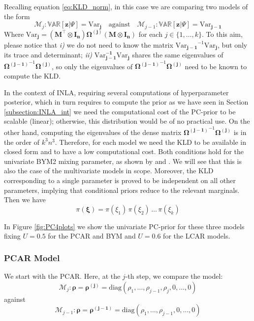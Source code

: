 \documentclass[openany, 11pt, oneside]{book}
\begin{document}
Recalling equation \ref{eq:KLD_norm}, in this case we are comparing two models of the form
$$
\mathcal{M}_j:\mathbb{VAR}\left[ \boldsymbol{z} \vert \Psi\right]=\boldsymbol{\mathrm{Var}_j}
\quad \text{against} \quad
\mathcal{M}_{j-1}:\mathbb{VAR}\left[ \boldsymbol{z} \vert \Psi\right]=\boldsymbol{\mathrm{Var}_{j-1}}
$$
Where $\boldsymbol{\mathrm{Var}_j} = \left( \boldsymbol{M^\top} \otimes \boldsymbol{I_n} \right) \boldsymbol{\Omega^{(j)}} \left( \boldsymbol{M} \otimes \boldsymbol{I_n} \right) $ for each $j \in \lbrace 1, \dots, k\rbrace$. To this aim, please notice that \textit{i)} we do not need to know the matrix $\boldsymbol{\mathrm{Var}_{j-1}}^{-1} \boldsymbol{\mathrm{Var}_{j}}$, but only its trace and determinant; 
\textit{ii)} $\boldsymbol{\mathrm{Var}_{j-1}^{-1} \mathrm{Var}_{j}}$ shares the same eigenvalues of ${\boldsymbol{\Omega^{(j-1)}}}^{-1} \boldsymbol{\Omega^{(j)}}$, so only the eigenvalues of ${\boldsymbol{\Omega^{(j-1)}}}^{-1} \boldsymbol{\Omega^{(j)}}$ need to be known to compute the KLD.

In the context of INLA, requiring several computations of hyperparameter posterior, which in turn requires to compute the prior as we have seen in Section \ref{subsection:INLA_int} we need the computational cost of the PC-prior to be scalable (linear); otherwise, this distribution would be of no practical use. On the other hand, computing the eigenvalues of the dense matrix ${\boldsymbol{\Omega^{(j-1)}}}^{-1} \boldsymbol{\Omega^{(j)}}$ is in the order of $k^3n^3$. Therefore, for each model we need the KLD to be available in closed form and to have a low computational cost. Both conditions hold for the univariate BYM2 mixing parameter, as shown by \cite{BYM2} and \cite{PC}. We will see that this is also the case of the multivariate models in scope. Moreover, the KLD corresponding to a single parameter is proved to be independent on all other parameters, implying that conditional priors reduce to the relevant marginals. Then we have
$$
\pi(\boldsymbol{\xi}) = \pi(\xi_1)\, \pi(\xi_2)\,\dots \,  \pi(\xi_k)
$$

In Figure \ref{fig:PC4plots} we show the univariate PC-prior for these three models fixing $U=0.5$ for the PCAR and BYM and $U=0.6$ for the LCAR models.

\subsubsection{PCAR Model}
We start with the PCAR. Here, at the $j$-th step, we compare the model:
$$
\mathcal{M}_j: \boldsymbol{\rho} = \boldsymbol{\rho^{(j)}} = \mathrm{diag}\left(\rho_1, \dots, \rho_{j-1}, \rho_j, 0, \dots, 0 \right)
$$
against
$$
\mathcal{M}_{j-1}: \boldsymbol{\rho} = \boldsymbol{\rho^{(j-1)}} = \mathrm{diag}\left(\rho_1, \dots, \rho_{j-1},0, \dots, 0 \right)
$$
\end{document}
